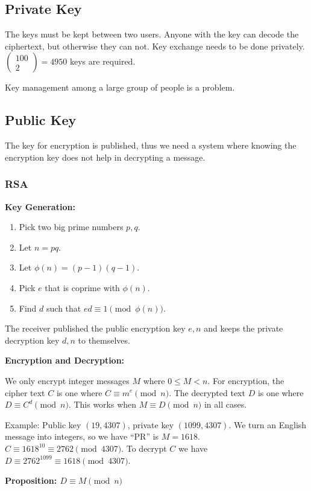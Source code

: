 \documentclass[12pt]{article}
\newcommand{\proposition}[1]{{\bf Proposition: \textit{#1}}}
\begin{document}
\subsection*{Private Key}
The keys must be kept between two users. Anyone with the key can decode the ciphertext, but otherwise they can not. Key exchange needs to be done privately. $\begin{pmatrix}100 \\ 2\end{pmatrix} = 4950$ keys are required.

Key management among a large group of people is a problem.

\subsection*{Public Key}
The key for encryption is published, thus we need a system where knowing the encryption key does not help in decrypting a message.

\subsubsection*{RSA}
{\bf Key Generation:}
\begin{enumerate}
\item Pick two big prime numbers $p, q$.
\item Let $n = pq$.
\item Let $\phi(n) = (p-1)(q-1)$.
\item Pick $e$ that is coprime with $\phi(n)$.
\item Find $d$ such that $ed \equiv 1 \pmod{\phi(n)}$.
\end{enumerate}

The receiver published the public encryption key $e, n$ and keeps the private decryption key $d, n$ to themselves.

{\bf Encryption and Decryption:}

We only encrypt integer messages $M$ where $0 \leq M < n$. For encryption, the cipher text $C$ is one where $C \equiv m^e \pmod{n}$. The decrypted text $D$ is one where $D \equiv C^d \pmod{n}$. This works when $M \equiv D \pmod n$ in all cases.

Example: Public key $(19, 4307)$, private key $(1099, 4307)$. We turn an English message into integers, so we have ``PR'' is $M = 1618$. $C \equiv 1618^{10} \equiv 2762 \pmod{4307}$. To decrypt $C$ we have $D \equiv 2762^{1099} \equiv 1618 \pmod{4307}$.

\proposition{$D \equiv M \pmod n$}
\end{document}

